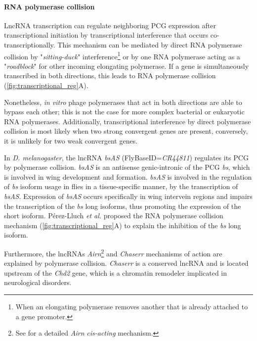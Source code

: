 \paragraph{RNA polymerase collision}
\label{paragraph:rna_pol_coll}

LncRNA transcription can regulate neighboring PCG expression after transcriptional initiation by transcriptional interference that occurs co-transcriptionally. This mechanism can be mediated by direct RNA polymerase collision by "\textit{sitting-duck}" interference\footnote{When an elongating polymerase removes another that is already attached to a gene promoter.} or by one RNA polymerase acting as a "\textit{roadblock}" for other incoming elongating polymerase.\autocite{pelechano_2013} If a gene is simultaneously transcribed in both directions, this leads to RNA polymerase collision (\autoref{fig:transcriptional_reg}A).

Nonetheless, \textit{in vitro} phage polymerases that act in both directions are able to bypass each other; this is not the case for more complex bacterial or eukaryotic RNA polymerases.\autocite{hobson_2012_collision} Additionally, transcriptional interference by direct polymerase collision is most likely when two strong convergent genes are present, conversely, it is unlikely for two weak convergent genes.\autocite{pelechano_2013}

In \textit{D. melanogaster}, the lncRNA \textit{bsAS} (FlyBaseID=\textit{CR44811}) regulates its PCG by polymerase collision. \textit{bsAS} is an antisense genic-intronic of the PCG \textit{bs}, which is involved in wing development and formation.\autocite{nussbaumer_2000_bs} \textit{bsAS} is involved in the regulation of \textit{bs} isoform usage in flies in a tissue-specific manner, by the transcription of \textit{bsAS}.\autocite{perez_blister} Expression of \textit{bsAS} occurs specifically in wing intervein regions and impairs the transcription of the \textit{bs} long isoforms, thus promoting the expression of the short isoform. Pérez-Lluch \textit{et al.} proposed the RNA polymerase collision mechanism (\autoref{fig:transcriptional_reg}A) to explain the inhibition of the \textit{bs} long isoform. 

Furthermore, the lncRNAs \textit{Airn}\footnote{See  for a detailed \textit{Airn} \textit{cis-acting} mechanism.} and \textit{Chaserr} mechanisms of action are explained by polymerase collision. \textit{Chaserr} is a conserved lncRNA and is located upstream of the \textit{Chd2} gene, which is a chromatin remodeler implicated in neurological disorders.\autocite{rom_2019_chaserr}

